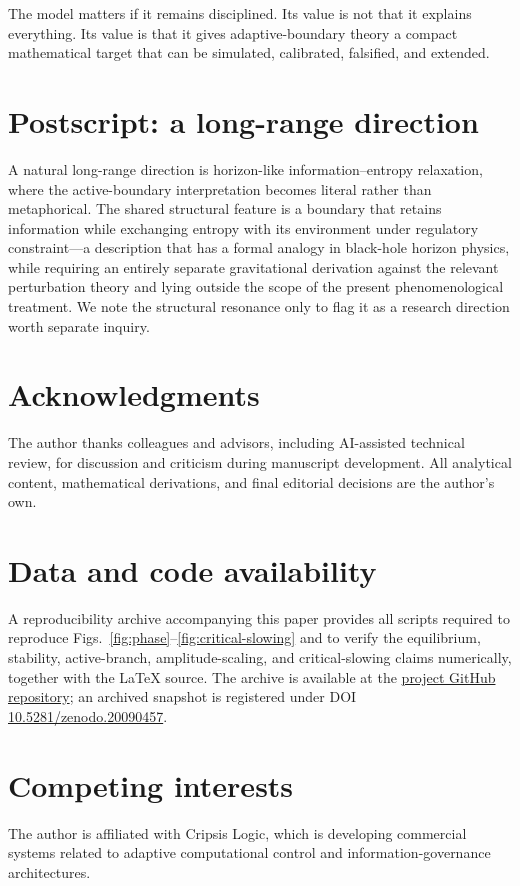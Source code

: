 \documentclass[11pt]{article}
\begin{document}
The model matters if it remains disciplined. Its value is not that it explains everything. Its value is that it gives adaptive-boundary theory a compact mathematical target that can be simulated, calibrated, falsified, and extended.

\section*{Postscript: a long-range direction}
A natural long-range direction is horizon-like information--entropy relaxation, where the active-boundary interpretation becomes literal rather than metaphorical. The shared structural feature is a boundary that retains information while exchanging entropy with its environment under regulatory constraint---a description that has a formal analogy in black-hole horizon physics, while requiring an entirely separate gravitational derivation against the relevant perturbation theory and lying outside the scope of the present phenomenological treatment. We note the structural resonance only to flag it as a research direction worth separate inquiry.

\section*{Acknowledgments}
The author thanks colleagues and advisors, including AI-assisted technical review, for discussion and criticism during manuscript development. All analytical content, mathematical derivations, and final editorial decisions are the author's own.

\section*{Data and code availability}
A reproducibility archive accompanying this paper provides all scripts required to reproduce Figs.~\ref{fig:phase}--\ref{fig:critical-slowing} and to verify the equilibrium, stability, active-branch, amplitude-scaling, and critical-slowing claims numerically, together with the LaTeX source. The archive is available at the \href{https://github.com/hellocripsis/adaptive-boundary-equation}{project GitHub repository}; an archived snapshot is registered under DOI \href{https://doi.org/10.5281/zenodo.20090457}{10.5281/zenodo.20090457}.

\section*{Competing interests}
The author is affiliated with Cripsis Logic, which is developing commercial systems related to adaptive computational control and information-governance architectures.
\end{document}
